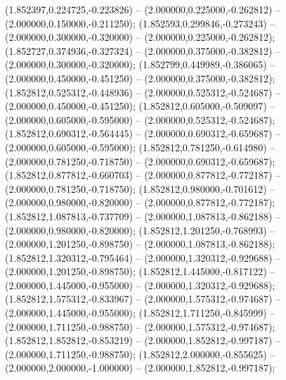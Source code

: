  (1.852397,0.224725,-0.223826) -- (2.000000,0.225000,-0.262812) -- (2.000000,0.150000,-0.211250);
 (1.852593,0.299846,-0.273243) -- (2.000000,0.300000,-0.320000) -- (2.000000,0.225000,-0.262812);
 (1.852727,0.374936,-0.327324) -- (2.000000,0.375000,-0.382812) -- (2.000000,0.300000,-0.320000);
 (1.852799,0.449989,-0.386065) -- (2.000000,0.450000,-0.451250) -- (2.000000,0.375000,-0.382812);
 (1.852812,0.525312,-0.448936) -- (2.000000,0.525312,-0.524687) -- (2.000000,0.450000,-0.451250);
 (1.852812,0.605000,-0.509097) -- (2.000000,0.605000,-0.595000) -- (2.000000,0.525312,-0.524687);
 (1.852812,0.690312,-0.564445) -- (2.000000,0.690312,-0.659687) -- (2.000000,0.605000,-0.595000);
 (1.852812,0.781250,-0.614980) -- (2.000000,0.781250,-0.718750) -- (2.000000,0.690312,-0.659687);
 (1.852812,0.877812,-0.660703) -- (2.000000,0.877812,-0.772187) -- (2.000000,0.781250,-0.718750);
 (1.852812,0.980000,-0.701612) -- (2.000000,0.980000,-0.820000) -- (2.000000,0.877812,-0.772187);
 (1.852812,1.087813,-0.737709) -- (2.000000,1.087813,-0.862188) -- (2.000000,0.980000,-0.820000);
 (1.852812,1.201250,-0.768993) -- (2.000000,1.201250,-0.898750) -- (2.000000,1.087813,-0.862188);
 (1.852812,1.320312,-0.795464) -- (2.000000,1.320312,-0.929688) -- (2.000000,1.201250,-0.898750);
 (1.852812,1.445000,-0.817122) -- (2.000000,1.445000,-0.955000) -- (2.000000,1.320312,-0.929688);
 (1.852812,1.575312,-0.833967) -- (2.000000,1.575312,-0.974687) -- (2.000000,1.445000,-0.955000);
 (1.852812,1.711250,-0.845999) -- (2.000000,1.711250,-0.988750) -- (2.000000,1.575312,-0.974687);
 (1.852812,1.852812,-0.853219) -- (2.000000,1.852812,-0.997187) -- (2.000000,1.711250,-0.988750);
 (1.852812,2.000000,-0.855625) -- (2.000000,2.000000,-1.000000) -- (2.000000,1.852812,-0.997187);

